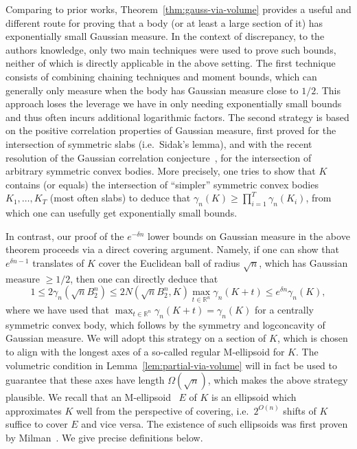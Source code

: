 \documentclass[12pt]{article}
\newcommand{\R}{{\mathbb{R}}}
\begin{document}
Comparing to prior works, Theorem~\ref{thm:gauss-via-volume} provides a useful
and different route for proving that a body (or at least a large section of it)
has exponentially small Gaussian measure. In the context of discrepancy, to the
authors knowledge, only two main techniques were used to prove such bounds,
neither of which is directly applicable in the above setting. The first
technique consists of combining chaining techniques and moment bounds, which can
generally only measure when the body has Gaussian measure close to $1/2$.  This
approach loses the leverage we have in only needing exponentially small bounds
and thus often incurs additional logarithmic factors. The second strategy is
based on the positive correlation properties of Gaussian measure, first proved
for the intersection of symmetric slabs (i.e.~Sidak's lemma), and with the
recent resolution of the Gaussian correlation conjecture~\cite{Royen14}, for the
intersection of arbitrary symmetric convex bodies. More precisely, one tries to
show that $K$ contains (or equals) the intersection of ``simpler'' symmetric
convex bodies $K_1,\dots,K_T$ (most often slabs) to deduce that $\gamma_n(K)
\geq \prod_{i=1}^T \gamma_n(K_i)$, from which one can usefully get exponentially
small bounds.

In contrast, our proof of the $e^{-\delta n}$ lower bounds on Gaussian measure
in the above theorem proceeds via a direct covering argument. Namely, if one can
show that $e^{\delta n-1}$ translates of $K$ cover the Euclidean ball of radius
$\sqrt{n}$, which has Gaussian measure $\geq 1/2$, then one can directly deduce
that 
\[
1 \leq 2\gamma_n(\sqrt{n}B_2^n) \leq 2N(\sqrt{n} B_2^n,K) \max_{t \in \R^n}
\gamma_n(K+t) \leq e^{\delta n} \gamma_n(K) ,
\]
where we have used that $\max_{t \in \R^n} \gamma_n(K+t) = \gamma_n(K)$ for a
centrally symmetric convex body, which follows by the symmetry and logconcavity
of Gaussian measure. We will adopt this strategy on a section of $K$, which is
chosen to align with the longest axes of a so-called regular M-ellipsoid for
$K$. The volumetric condition in Lemma~\ref{lem:partial-via-volume} will in fact
be used to guarantee that these axes have length $\Omega(\sqrt{n})$, which makes
the above strategy plausible. We recall that an M-ellipsoid~ $E$ of $K$ is an
ellipsoid which approximates $K$ well from the perspective of covering,
i.e.~$2^{O(n)}$ shifts of $K$ suffice to cover $E$ and vice versa. The existence
of such ellipsoids was first proven by Milman~\cite{Milman86-reverseBM}. We give
precise definitions below. 
\end{document}
